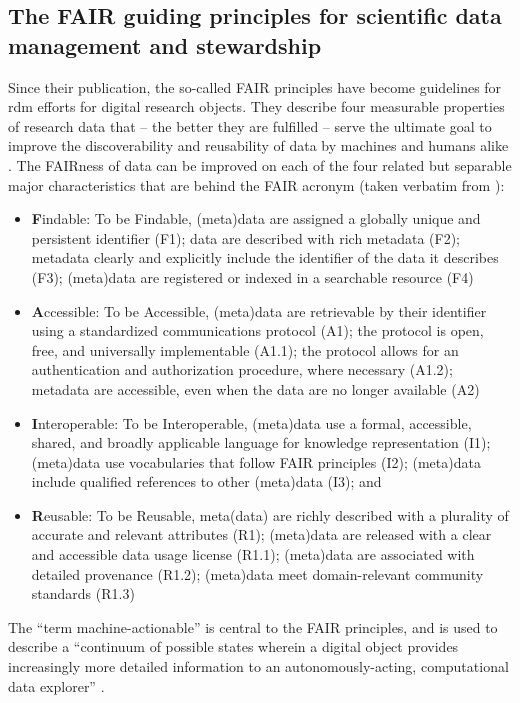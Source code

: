 \subsection{The FAIR guiding principles for scientific data management and stewardship}

Since their publication, the so-called \gls{FAIR} principles \citep{wilkinson2016fair} have become guidelines for \gls{rdm} efforts for digital research objects.
They describe four measurable properties of research data that -- the better they are fulfilled -- serve the ultimate goal to improve the discoverability and reusability of data by machines and humans alike \citep{wilkinson2016fair}.
The \gls{FAIR}ness of data can be improved on each of the four related but separable major characteristics that are behind the \gls{FAIR} acronym (taken verbatim from \citet{wilkinson2016fair}):

\begin{itemize}
	\item \textbf{F}indable: To be Findable, (meta)data  are assigned a globally unique and persistent identifier (F1); data are described with rich metadata (F2); metadata clearly and explicitly include the identifier of the data it describes (F3);  (meta)data are registered or indexed in a searchable resource (F4)
	\item \textbf{A}ccessible: To be Accessible, (meta)data are retrievable by their identifier using a standardized communications protocol (A1); the protocol is open, free, and universally implementable (A1.1); the protocol allows for an authentication and authorization procedure, where necessary (A1.2);  metadata are accessible, even when the data are no longer available (A2)
	\item \textbf{I}nteroperable:  To be Interoperable, (meta)data use a formal, accessible, shared, and broadly applicable language for knowledge representation (I1); (meta)data use vocabularies that follow FAIR principles (I2); (meta)data include qualified references to other (meta)data (I3); and
	\item \textbf{R}eusable: To be Reusable, meta(data) are richly described with a plurality of accurate and relevant attributes (R1); (meta)data are released with a clear and accessible data usage license (R1.1); (meta)data are associated with detailed provenance (R1.2); (meta)data meet domain-relevant community standards (R1.3)
\end{itemize}

The ``term machine-actionable'' is central to the \gls{FAIR} principles, and is used to describe a ``continuum of possible states wherein a digital object provides increasingly more detailed information to an autonomously-acting, computational data explorer'' \citep{wilkinson2016fair}.


